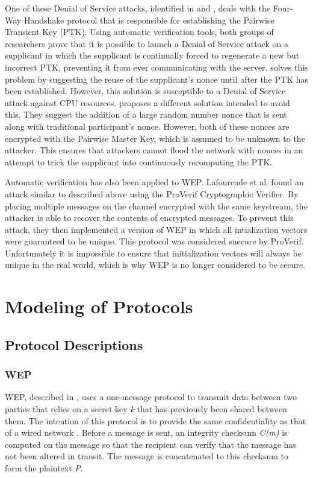 \documentclass[11pt, twocolumn]{article} %
\begin{document}
One of these Denial of Service attacks, identified in \cite{he04} and \cite{liu08}, deals with the Four-Way Handshake protocol that is responsible for establishing the Pairwise Transient Key (PTK).  Using automatic verification tools, both groups of researchers prove that it is possible to launch a Denial of Service attack on a supplicant in which the supplicant is continually forced to regenerate a new but incorrect PTK, preventing it from ever communicating with the server.  \cite{he04} solves this problem by suggesting the reuse of the supplicant's nonce until after the PTK has been established.  However, this solution is susceptible to a Denial of Service attack against CPU resources.  \cite{liu08} proposes a different solution intended to avoid this.  They suggest the addition of a large random number nonce that is sent along with traditional participant's nonce.  However, both of these nonces are encrypted with the Pairwise Master Key, which is assumed to be unknown to the attacker.  This ensures that attackers cannot flood the network with nonces in an attempt to trick the supplicant into continuously recomputing the PTK.

Automatic verification has also been applied to WEP.  Lafourcade et al. found an attack similar to \cite{borisov01} described above using the ProVerif Cryptographic Verifier. By placing multiple messages on the channel encrypted with the same keystream, the attacker is able to recover the contents of encrypted messages.  To prevent this attack, they then implemented a version of WEP in which all intialization vectors were guaranteed to be unique.  This protocol was considered snecure by ProVerif.  Unfortunately it is impossible to ensure that initialization vectors will always be unique in the real world, which is why WEP is no longer considered to be secure.
 
\section{Modeling of Protocols}
\label{sec:model}
\subsection{Protocol Descriptions}
\subsubsection{WEP}
\label{sec:WEP Desc}
WEP, described in \cite{borisov01}, uses a one-message protocol to transmit data between two parties that relies on a secret key \textit{k} that has previously been shared between them.  The intention of this protocol is to provide the same confidentiality as that of a wired network \cite{IEEE802.11}.  Before a message is sent, an integrity checksum \textit{C(m)} is computed on the message so that the recipient can verify that the message has not been altered in transit.  The message is concatenated to this checksum to form the plaintext \textit{P}.
\end{document}
